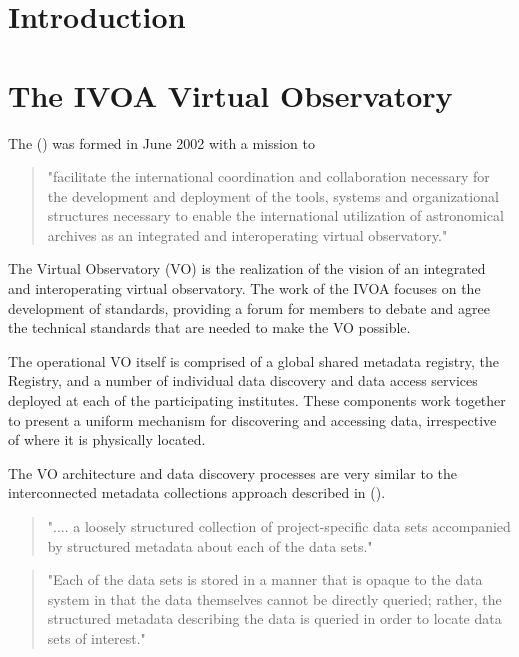 \documentclass{article}
\begin{document}
\section{Introduction}

\section{The IVOA Virtual Observatory}

The  (\cite{ivoa}) was formed in June 2002 with a mission to
\begin{quote}
"facilitate the international coordination and collaboration
necessary for the development and deployment of the tools, systems and
organizational structures necessary to enable the international utilization of
astronomical archives as an integrated and interoperating virtual observatory."
\end{quote}

The Virtual Observatory (VO) is the realization of the \cite{ivoa} vision of
an integrated and interoperating virtual observatory.
The work of the IVOA focuses on the development of standards, providing a forum
for members to debate and agree the technical standards that are needed to make
the VO possible.

The operational VO itself is comprised of a global shared metadata registry,
the Registry, and a number of individual data discovery and data access services
deployed at each of the participating institutes.
These components work together to present a uniform mechanism for discovering
and accessing data, irrespective of where it is physically located.

The VO architecture and data discovery processes are very similar to the
interconnected metadata collections approach described in
 (\cite{jones-2006}).

\begin{quote}
".... a loosely structured collection of project-specific data sets
accompanied by structured metadata about each of the data sets."
\end{quote}

\begin{quote}
"Each of the data sets is stored in a manner that is opaque to the data system in
that the data themselves cannot be directly queried; rather, the structured
metadata describing the data is queried in order to locate data sets of
interest."
\end{quote}
\end{document}
